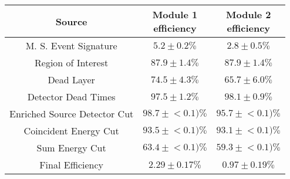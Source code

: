 \begin{tabular}{|c|c|c|}
\hline
  Source & \makecell{Module 1\\efficiency} & \makecell{Module 2\\efficiency} \\
\hline
  M. S. Event Signature & $5.2 \pm 0.2\%$ & $2.8 \pm 0.5\%$ \\
  Region of Interest & $87.9 \pm 1.4\%$ & $87.9 \pm 1.4\%$ \\
  Dead Layer & $74.5 \pm 4.3\%$ & $65.7 \pm 6.0\%$ \\
  Detector Dead Times & $97.5 \pm 1.2\%$ & $98.1 \pm 0.9\%$ \\
  Enriched Source Detector Cut & $98.7 \pm{}<\!0.1)\%$ & $95.7 \pm{}<\!0.1)\%$ \\
  Coincident Energy Cut & $93.5 \pm{}<\!0.1)\%$ & $93.1 \pm{}<\!0.1)\%$ \\
  Sum Energy Cut & $63.4 \pm{}<\!0.1)\%$ & $59.3 \pm{}<\!0.1)\%$ \\
  \hline Final Efficiency & $2.29 \pm 0.17\%$ & $0.97 \pm 0.19\%$ \\
\hline
\end{tabular}
